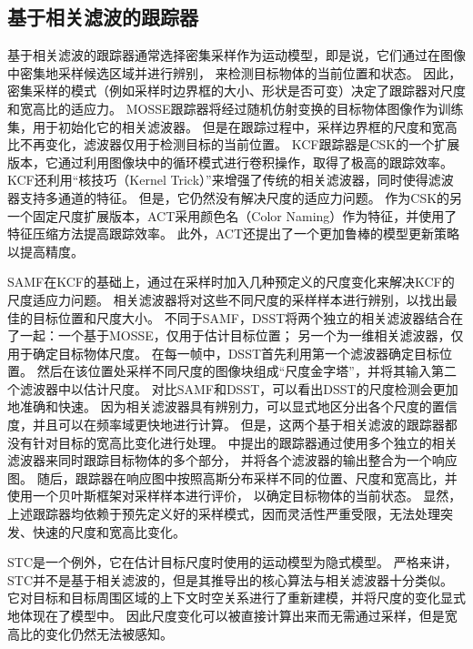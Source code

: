 \subsection{基于相关滤波的跟踪器}
基于相关滤波的跟踪器通常选择密集采样作为运动模型，即是说，它们通过在图像中密集地采样候选区域并进行辨别，
来检测目标物体的当前位置和状态。
因此，密集采样的模式（例如采样时边界框的大小、形状是否可变）决定了跟踪器对尺度和宽高比的适应力。
MOSSE跟踪器将经过随机仿射变换的目标物体图像作为训练集，用于初始化它的相关滤波器。
但是在跟踪过程中，采样边界框的尺度和宽高比不再变化，滤波器仅用于检测目标的当前位置。
KCF跟踪器是CSK的一个扩展版本，它通过利用图像块中的循环模式进行卷积操作，取得了极高的跟踪效率。
KCF还利用``核技巧（Kernel Trick）''来增强了传统的相关滤波器，同时使得滤波器支持多通道的特征。
但是，它仍然没有解决尺度的适应力问题。
作为CSK的另一个固定尺度扩展版本，ACT采用颜色名（Color Naming）作为特征，并使用了特征压缩方法提高跟踪效率。
此外，ACT还提出了一个更加鲁棒的模型更新策略以提高精度。

SAMF在KCF的基础上，通过在采样时加入几种预定义的尺度变化来解决KCF的尺度适应力问题。
相关滤波器将对这些不同尺度的采样样本进行辨别，以找出最佳的目标位置和尺度大小。
不同于SAMF，DSST将两个独立的相关滤波器结合在了一起：一个基于MOSSE，仅用于估计目标位置；
另一个为一维相关滤波器，仅用于确定目标物体尺度。
在每一帧中，DSST首先利用第一个滤波器确定目标位置。
然后在该位置处采样不同尺度的图像块组成``尺度金字塔''，并将其输入第二个滤波器中以估计尺度。
对比SAMF和DSST，可以看出DSST的尺度检测会更加地准确和快速。
因为相关滤波器具有辨别力，可以显式地区分出各个尺度的置信度，并且可以在频率域更快地进行计算。
但是，这两个基于相关滤波的跟踪器都没有针对目标的宽高比变化进行处理。
\cite{pbcf}中提出的跟踪器通过使用多个独立的相关滤波器来同时跟踪目标物体的多个部分，
并将各个滤波器的输出整合为一个响应图。
随后，跟踪器在响应图中按照高斯分布采样不同的位置、尺度和宽高比，并使用一个贝叶斯框架对采样样本进行评价，
以确定目标物体的当前状态。
显然，上述跟踪器均依赖于预先定义好的采样模式，因而灵活性严重受限，无法处理突发、快速的尺度和宽高比变化。

STC是一个例外，它在估计目标尺度时使用的运动模型为隐式模型。
严格来讲，STC并不是基于相关滤波的，但是其推导出的核心算法与相关滤波器十分类似。
它对目标和目标周围区域的上下文时空关系进行了重新建模，并将尺度的变化显式地体现在了模型中。
因此尺度变化可以被直接计算出来而无需通过采样，但是宽高比的变化仍然无法被感知。

